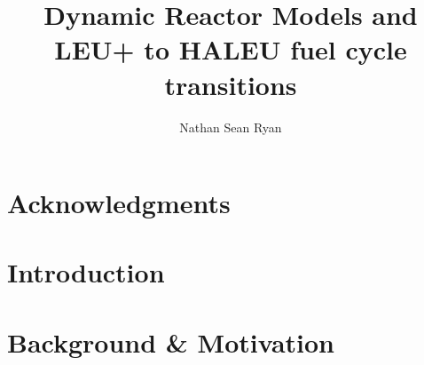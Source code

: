 \documentclass[edeposit,fullpage]{uiucthesis2018}
\title{Dynamic Reactor Models and LEU+ to HALEU fuel cycle transitions}
\author{Nathan Sean Ryan}
\begin{document}
\maketitle

\frontmatter
\begin{abstract}


\glsresetall

\end{abstract}

\chapter*{Acknowledgments}




\tableofcontents
\listoftables
\listoffigures


\pagebreak
\mainmatter

\chapter{Introduction}
\label{ch:introduction}
\glsresetall




\chapter{Background \& Motivation}
\label{ch:background}
\glsresetall
\end{document}
